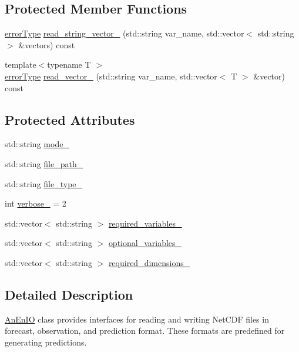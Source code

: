 \subsection*{Protected Member Functions}
\begin{DoxyCompactItemize}
\item 
\mbox{\hyperlink{class_an_en_i_o_aa56bc1ec6610b86db4349bce20f9ead0}{error\+Type}} \mbox{\hyperlink{class_an_en_i_o_a17e7a4c520675c23b01cbd65c7ffe1d5}{read\+\_\+string\+\_\+vector\+\_\+}} (std\+::string var\+\_\+name, std\+::vector$<$ std\+::string $>$ \&vectors) const
\item 
{\footnotesize template$<$typename T $>$ }\\\mbox{\hyperlink{class_an_en_i_o_aa56bc1ec6610b86db4349bce20f9ead0}{error\+Type}} \mbox{\hyperlink{class_an_en_i_o_a3c3a3f86f90ea7610e086d371414d54f}{read\+\_\+vector\+\_\+}} (std\+::string var\+\_\+name, std\+::vector$<$ T $>$ \&vector) const
\end{DoxyCompactItemize}
\subsection*{Protected Attributes}
\begin{DoxyCompactItemize}
\item 
std\+::string \mbox{\hyperlink{class_an_en_i_o_a311891a4a1a6b3907246da853bc4e5c8}{mode\+\_\+}}
\item 
std\+::string \mbox{\hyperlink{class_an_en_i_o_ab892e06ca18be5e0c442c9e882e4475f}{file\+\_\+path\+\_\+}}
\item 
std\+::string \mbox{\hyperlink{class_an_en_i_o_addbfb455f641a394c14907163874d8fe}{file\+\_\+type\+\_\+}}
\item 
int \mbox{\hyperlink{class_an_en_i_o_a4f6abd007730e4a8f54d57cc3572bd9e}{verbose\+\_\+}} = 2
\item 
std\+::vector$<$ std\+::string $>$ \mbox{\hyperlink{class_an_en_i_o_a119dcb81d3811547f0e37d6c3752f0a7}{required\+\_\+variables\+\_\+}}
\item 
std\+::vector$<$ std\+::string $>$ \mbox{\hyperlink{class_an_en_i_o_a43f82ffbafbbda7ab8c9471d0bce70df}{optional\+\_\+variables\+\_\+}}
\item 
std\+::vector$<$ std\+::string $>$ \mbox{\hyperlink{class_an_en_i_o_adf42061631c78508bde00de7d22a65b4}{required\+\_\+dimensions\+\_\+}}
\end{DoxyCompactItemize}


\subsection{Detailed Description}
\mbox{\hyperlink{class_an_en_i_o}{An\+En\+IO}} class provides interfaces for reading and writing Net\+C\+DF files in forecast, observation, and prediction format. These formats are predefined for generating predictions. 


